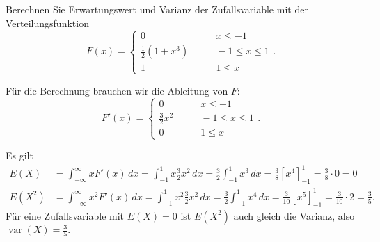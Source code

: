Berechnen Sie Erwartungswert und Varianz der Zufallsvariable mit der
Verteilungsfunktion
\[
F(x)=\begin{cases}
0&\qquad x\le -1\\
\frac12(1+x^3)&\qquad -1\le x\le 1\\
1&\qquad 1\le x
\end{cases}.
\]

\begin{loesung}
Für die Berechnung brauchen wir die Ableitung von $F$:
\[
F'(x)=\begin{cases}
0&\qquad x\le -1\\
\frac32x^2&\qquad -1\le x\le 1\\
0&\qquad 1\le x
\end{cases}.
\]

Es gilt
\begin{align*}
E(X)
&=\int_{-\infty}^{\infty}x F'(x)\,dx
=\int_{-1}^1x \frac32x^2\,dx
=\frac32\int_{-1}^1x^3\,dx
=\frac38\left[x^4\right]_{-1}^1
=\frac38\cdot 0=0\\
E(X^2)
&=\int_{-\infty}^{\infty}x^2 F'(x)\,dx
=\int_{-1}^1x^2 \frac32x^2\,dx
=\frac32\int_{-1}^1x^4\,dx=\frac3{10}\left[x^5\right]_{-1}^1
=\frac3{10}\cdot 2=\frac35.
\end{align*}
Für eine Zufallsvariable mit $E(X)=0$ ist $E(X^2)$ auch gleich
die Varianz, also $\operatorname{var}(X)=\frac35.$
\end{loesung}


